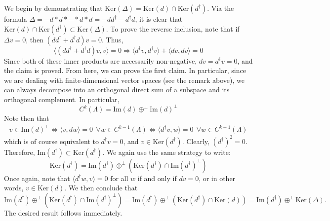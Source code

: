\documentclass[aps,pra,showpacs,notitlepage,onecolumn,superscriptaddress,nofootinbib]{revtex4-1}
\theoremstyle{definition}
\begin{document}
\noindent We begin by demonstrating that $\text{Ker}(\Delta) = \text{Ker}(d) \cap \text{Ker}(d^{\dagger})$. Via the formula $\Delta = -d * d * - * d * d = -d d^{\dagger} - d^{\dagger} d$, it is clear that
$\text{Ker}(d) \cap \text{Ker}(d^{\dagger}) \subset \text{Ker}(\Delta)$. To prove the reverse inclusion, note that if $\Delta v = 0$, then $(d d^{\dagger} + d^{\dagger} d) v = 0$. Thus,
\begin{equation}
  \langle (d d^{\dagger} + d^{\dagger} d) v, v \rangle = 0 \Longrightarrow \langle d^{\dagger} v, d^{\dagger} v \rangle + \langle dv, dv \rangle = 0
\end{equation}
Since both of these inner products are necessarily non-negative, $dv = d^{\dagger} v = 0$, and the claim is proved. From here,
we can prove the first claim. In particular, since we are dealing with finite-dimensional vector spaces (see the remark above), we can always decompose into an orthogonal direct sum of a subspace
and its orthogonal complement. In particular,
\begin{equation}
  C^{k}(\Lambda) = \text{Im}(d) \oplus^{\perp} \text{Im}(d)^{\perp}
\end{equation}
Note then that
\begin{align}
  v \in \text{Im}(d)^{\perp} \Longleftrightarrow \langle v, d w \rangle = 0 \ \ \forall w \in C^{k - 1}(\Lambda) \Longleftrightarrow \langle d^{\dagger} v, w \rangle = 0 \ \ \forall w \in C^{k - 1}(\Lambda)
\end{align}
which is of course equivalent to $d^{\dagger} v = 0$, and $v \in \text{Ker}(d^{\dagger})$. Clearly, $(d^{\dagger})^2 = 0$. Therefore, $\text{Im}(d^{\dagger}) \subset \text{Ker}(d^{\dagger})$.
We again use the same strategy to write:
\begin{equation}
  \text{Ker}(d^{\dagger}) = \text{Im}(d^{\dagger}) \oplus^{\perp} \left( \text{Ker}(d^{\dagger}) \cap \text{Im}(d^{\dagger})^{\perp} \right)
\end{equation}
Once again, note that $\langle d^{\dagger} w, v \rangle = 0$ for all $w$ if and only if $dv = 0$, or in other words, $v \in \text{Ker}(d)$. We then conclude that
\begin{equation}
  \text{Im}(d^{\dagger}) \oplus^{\perp} \left( \text{Ker}(d^{\dagger}) \cap \text{Im}(d^{\dagger})^{\perp} \right) = \text{Im}(d^{\dagger}) \oplus^{\perp} \left( \text{Ker}(d^{\dagger}) \cap \text{Ker}(d) \right) = \text{Im}(d^{\dagger}) \oplus^{\perp} \text{Ker}(\Delta).
\end{equation}
The desired result follows immediately.
\end{document}
